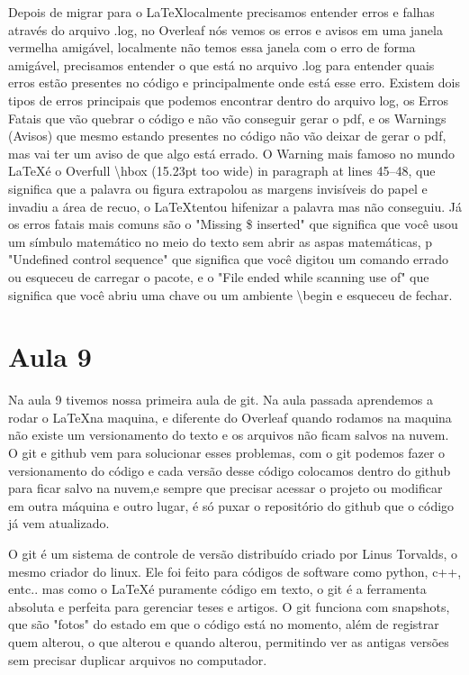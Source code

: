 Depois de migrar para o \LaTeX localmente precisamos entender erros e falhas através do arquivo .log, no Overleaf nós vemos os erros e avisos em uma janela vermelha amigável, localmente não temos essa janela com o erro de forma amigável, precisamos entender o que está no arquivo .log para entender quais erros estão presentes no código e principalmente onde está esse erro. Existem dois tipos de erros principais que podemos encontrar dentro do arquivo log, os Erros Fatais que vão quebrar o código e não vão conseguir gerar o pdf, e os Warnings (Avisos) que mesmo estando presentes no código não vão deixar de gerar o pdf, mas vai ter um aviso de que algo está errado. O Warning mais famoso no mundo \LaTeX é o Overfull \textbackslash hbox (15.23pt too wide) in paragraph at lines 45--48, que significa que a palavra ou figura extrapolou as margens invisíveis do papel e invadiu a área de recuo, o \LaTeX tentou hifenizar a palavra mas não conseguiu. Já os erros fatais mais comuns são o "Missing \$ inserted" que significa que você usou um símbulo matemático no meio do texto sem abrir as aspas matemáticas, p "Undefined control sequence" que significa que você digitou um comando errado ou esqueceu de carregar o pacote, e o "File ended while scanning use of" que significa que você abriu uma chave ou um ambiente \textbackslash begin e esqueceu de fechar. 



\section{Aula 9}

Na aula 9 tivemos nossa primeira aula de git. Na aula passada aprendemos a rodar o \LaTeX na maquina, e diferente do Overleaf quando rodamos na maquina não existe um versionamento do texto e os arquivos não ficam salvos na nuvem. O git e github vem para solucionar esses problemas, com o git podemos fazer o versionamento do código e cada versão desse código colocamos dentro do github para ficar salvo na nuvem,e sempre que precisar acessar o projeto ou modificar em outra máquina e outro lugar, é só puxar o repositório do github que o código já vem atualizado.

O git é um sistema de controle de versão distribuído criado por Linus Torvalds, o mesmo criador do linux. Ele foi feito para códigos de software como python, c++, entc.. mas como o \LaTeX é puramente código em texto, o git é a ferramenta absoluta e perfeita para gerenciar teses e artigos. O git funciona com snapshots, que são "fotos" do estado em que o código está no momento, além de registrar quem alterou, o que alterou e quando alterou, permitindo ver as antigas versões sem precisar duplicar arquivos no computador.

